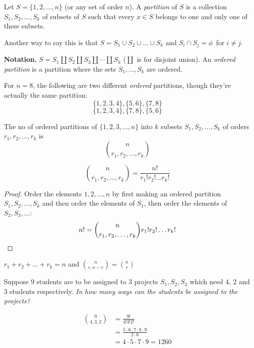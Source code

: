 \documentclass[10pt]{scrartcl}
\begin{document}
\begin{definition}
Let $S = \{1,2,\dots,n\}$ (or any set of order $n$). A \emph{partition} of $S$ is a collection $S_1,S_2,\dots,S_k$ of subsets of $S$ such that every $x \in S$ belongs to one and only one of these subsets. 
\end{definition}

Another way to say this is that $S = S_1 \cup S_2 \cup \dots \cup S_k$ and $S_i \cap S_j = \phi \,$ for $i \neq j$. 


\textbf{Notation.} $S = S_1\coprod S_2 \coprod S_3 \coprod \cdots \coprod S_k $ ($\coprod$ is for disjoint union). An \emph{ordered partition} is a partition where the sets $S_1,\dots,S_k$ are ordered. \\

\begin{example}
For $n = 8$, the following are two different \emph{ordered} partitions, though they're actually the same partition: 
\[\{1,2,3,4\}, \{5,6\}, \{7,8\}\]	
\[\{1,2,3,4\}, \{7,8\}, \{5,6\}\]	
\end{example}\vspace*{5pt}

\begin{definition}
The no of ordered partitions of $\{1,2,3,\dots,n\}$ into $k$ subsets $S_1,S_2,\dots,S_k$ of orders $r_1,r_2,\dots,r_k$ is 
\[\binom{n}{r_1,r_2,\dots,r_k}\]	
\end{definition}\vspace*{5pt}

\begin{proposition}
	\[\binom{n}{r_1,r_2,\dots,r_k} = \frac{n!}{r_1!r_2!\dots r_k!}\]	
\end{proposition}
\begin{proof}
	Order the elements $1,2,\dots,n$ by first making an ordered partition $S_1,S_2,\dots,S_k$ and then order the elements of $S_1$, then order the elements of $S_2, S_3,\dots$: 
	\[n! = \binom{n}{r_1,r_2,\dots,r_k}r_1!r_2!\dots r_k!\qedhere\]
\end{proof}\vsp

\begin{remark}
$r_1+r_2 + \dots + r_k = n$ and $\binom{n}{r,n-r} = \binom{n}{r}$	
\end{remark}

\begin{example}
Suppose $9$ students are to be assigned to $3$ projects $S_1,S_2,S_3$ which need $4,\,2$ and $3$ students respectively. 
\emph{In how many ways can the students be assigned to the projects?}

\[
\begin{aligned}
  \binom{9}{4,3,2} &= \frac{9!}{4!3!2!}\\
  &= \frac{5\cdot 6\cdot 7\cdot 8\cdot 9}{2\cdot 6}\\
  &= 4\cdot 5 \cdot 7 \cdot 9 = 1260
\end{aligned}
\]
\end{example}\vspace*{5pt}
\end{document}
